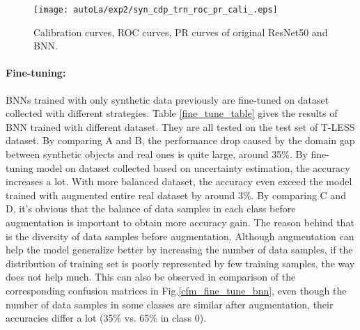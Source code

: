 \begin{figure}[H]
	\begin{center}
		\texttt{[image: autoLa/exp2/syn\_cdp\_trn\_roc\_pr\_cali\_.eps]}
		\caption{Calibration curves, ROC curves, PR curves of original ResNet50 and BNN.}		
		\label{autoLa_exp2_cali}
	\end{center}
\end{figure}


\paragraph{Fine-tuning:} BNNs trained with only synthetic data previously are fine-tuned on dataset collected with different strategies. Table \ref{fine_tune_table} gives the results of BNN trained with different dataset. They are all tested on the test set of T-LESS dataset. By comparing A and B, the performance drop caused by the domain gap between synthetic objects and real ones is quite large, around 35\%. By fine-tuning model on dataset collected based on uncertainty estimation, the accuracy increases a lot. With more balanced dataset, the accuracy even exceed the model trained with augmented entire real dataset by around 3\%. By comparing C and D, it's obvious that the balance of data samples in each class before augmentation is important to obtain more accuracy gain. The reason behind that is the diversity of data samples before augmentation. Although augmentation can help the model generalize better by increasing the number of data samples, if the distribution of training set is poorly represented by few training samples, the way does not help much. This can also be observed in comparison of the corresponding confusion matrices in Fig.\ref{cfm_fine_tune_bnn}, even though the number of data samples in some classes are similar after augmentation, their accuracies differ a lot (35\% vs. 65\% in class 0).

